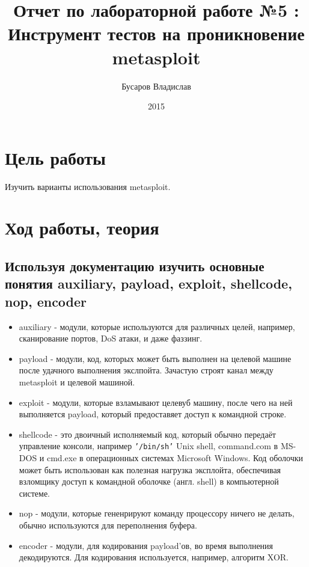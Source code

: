 \documentclass[11pt, a4paper]{article}		%
\author{Бусаров Владислав}
\title{Отчет по лабораторной работе №5 :\\ Инструмент тестов на проникновение metasploit}
\date{2015}
\begin{document}
\maketitle
\tableofcontents
\newpage



\section{Цель работы}

Изучить варианты использования metasploit.




\section{Ход работы, теория}



\subsection{Используя документацию изучить основные понятия auxiliary, payload, exploit, shellcode,	nop, encoder}

\begin{itemize}

\item auxiliary - модули, которые используются для различных целей, например, сканирование портов, DoS атаки, и даже фаззинг.

\item payload - модули, код, которых может быть выполнен на целевой машине после удачного выполнения экслпойта. Зачастую строят канал между metasploit и целевой машиной.

\item exploit - модули, которые взламывают целевуб машину, после чего на ней выполняется payload, который предоставяет доступ к командной строке.

\item shellcode - это двоичный исполняемый код, который обычно передаёт управление консоли, например \verb'’/bin/sh’' Unix shell, command.com в MS-DOS и cmd.exe в операционных системах Microsoft Windows. Код оболочки может быть использован как полезная нагрузка эксплойта, обеспечивая взломщику доступ к командной оболочке (англ. shell) в компьютерной системе.

\item nop - модули, которые гененрируют команду процессору ничего не делать, обычно используются для переполнения буфера.

\item encoder - модули, для кодирования payload'ов, во время выполнения декодируются. Для кодирования используется, например, алгоритм XOR. 

\end{itemize}
\end{document}
